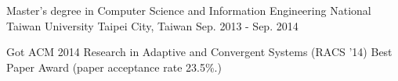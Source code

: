 

\begin{cventries}

  \cventry
    {Master's degree in Computer Science and Information Engineering} %
    {National Taiwan University} %
    {Taipei City, Taiwan} %
    {Sep. 2013 - Sep. 2014} %
    {
      \begin{cvitems} %
        \item {Got ACM 2014 Research in Adaptive and Convergent Systems (RACS '14) Best Paper Award (paper acceptance rate 23.5\%.)}
      \end{cvitems}
    }

\end{cventries}
